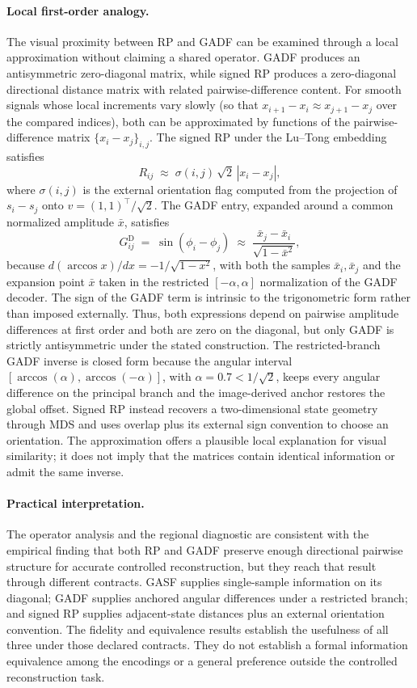 \documentclass[10pt,a4paper,parskip=half-]{scrartcl}
\begin{document}
\paragraph*{Local first-order analogy.}
The visual proximity between RP and GADF can be examined through a local approximation without claiming a shared operator. GADF produces an antisymmetric zero-diagonal matrix, while signed RP produces a zero-diagonal directional distance matrix with related pairwise-difference content. For smooth signals whose local increments vary slowly (so that $x_{i+1}-x_i\approx x_{j+1}-x_j$ over the compared indices), both can be approximated by functions of the pairwise-difference matrix $\{x_i-x_j\}_{i,j}$. The signed RP under the Lu--Tong embedding satisfies
\[
R_{ij} \;\approx\; \sigma(i,j)\,\sqrt{2}\,|x_i-x_j|,
\]
where $\sigma(i,j)$ is the external orientation flag computed from the projection of $s_i-s_j$ onto $v=(1,1)^\top/\sqrt{2}$. The GADF entry, expanded around a common normalized amplitude $\bar{x}$, satisfies
\[
G^{\mathrm{D}}_{ij} \;=\; \sin(\phi_i-\phi_j) \;\approx\; \frac{\bar{x}_j-\bar{x}_i}{\sqrt{1-\bar{x}^2}},
\]
because $d(\arccos x)/dx=-1/\sqrt{1-x^2}$, with both the samples $\bar{x}_i,\bar{x}_j$ and the expansion point $\bar{x}$ taken in the restricted $[-\alpha,\alpha]$ normalization of the GADF decoder. The sign of the GADF term is intrinsic to the trigonometric form rather than imposed externally. Thus, both expressions depend on pairwise amplitude differences at first order and both are zero on the diagonal, but only GADF is strictly antisymmetric under the stated construction. The restricted-branch GADF inverse is closed form because the angular interval $[\arccos(\alpha),\arccos(-\alpha)]$, with $\alpha=0.7<1/\sqrt2$, keeps every angular difference on the principal branch and the image-derived anchor restores the global offset. Signed RP instead recovers a two-dimensional state geometry through MDS and uses overlap plus its external sign convention to choose an orientation. The approximation offers a plausible local explanation for visual similarity; it does not imply that the matrices contain identical information or admit the same inverse.

\paragraph*{Practical interpretation.}
The operator analysis and the regional diagnostic are consistent with the empirical finding that both RP and GADF preserve enough directional pairwise structure for accurate controlled reconstruction, but they reach that result through different contracts. GASF supplies single-sample information on its diagonal; GADF supplies anchored angular differences under a restricted branch; and signed RP supplies adjacent-state distances plus an external orientation convention. The fidelity and equivalence results establish the usefulness of all three under those declared contracts. They do not establish a formal information equivalence among the encodings or a general preference outside the controlled reconstruction task.
\end{document}
